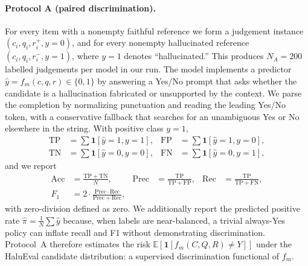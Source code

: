 \documentclass[11pt]{article}
\begin{document}
\paragraph{Protocol A (paired discrimination).}
For every item with a nonempty faithful reference we form a judgement instance
$(c_i,q_i,r_i^+,y=0)$, and for every nonempty hallucinated reference
$(c_i,q_i,r_i^-,y=1)$, where $y=1$ denotes ``hallucinated.'' This produces
$N_A=200$ labelled judgements per model in our run. The model implements a
predictor $\hat y=f_m(c,q,r)\in\{0,1\}$ by answering a Yes/No prompt that asks
whether the candidate is a hallucination fabricated or unsupported by the
context. We parse the completion by normalizing punctuation and reading the
leading Yes/No token, with a conservative fallback that searches for an
unambiguous Yes or No elsewhere in the string. With positive class $y=1$,
\begin{align*}
\mathrm{TP}&=\sum\mathbf{1}[\hat y=1,y=1],&
\mathrm{FP}&=\sum\mathbf{1}[\hat y=1,y=0],\\
\mathrm{TN}&=\sum\mathbf{1}[\hat y=0,y=0],&
\mathrm{FN}&=\sum\mathbf{1}[\hat y=0,y=1],
\end{align*}
and we report
\begin{align*}
\mathrm{Acc}&=\frac{\mathrm{TP}+\mathrm{TN}}{N},&
\mathrm{Prec}&=\frac{\mathrm{TP}}{\mathrm{TP}+\mathrm{FP}},&
\mathrm{Rec}&=\frac{\mathrm{TP}}{\mathrm{TP}+\mathrm{FN}},\\
F_1&=2\cdot\frac{\mathrm{Prec}\cdot\mathrm{Rec}}{\mathrm{Prec}+\mathrm{Rec}},
\end{align*}
with zero-division defined as zero. We additionally report the predicted
positive rate $\widehat{\pi}=\frac{1}{N}\sum\hat y$ because, when labels are
near-balanced, a trivial always-Yes policy can inflate recall and F1 without
demonstrating discrimination. Protocol~A therefore estimates the risk
$\mathbb{E}[\mathbf{1}[f_m(C,Q,R)\neq Y]]$ under the HaluEval candidate
distribution: a supervised discrimination functional of $f_m$.
\end{document}
